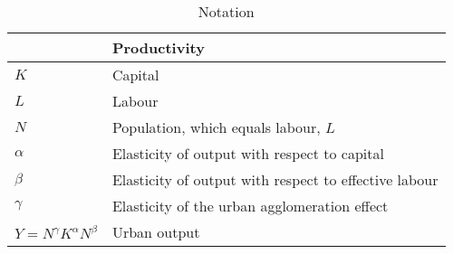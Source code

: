 \newpage
\begin{longtable}{lp{10cm}}
\caption{Notation}                       \\

\hline           &  \textbf{Productivity} \\ \hline
$K$              &  Capital               \\ 
$L$              &  Labour                \\
$N$              &  Population, which equals labour, $L$                  \\ 
$\alpha$         &  Elasticity of output with respect to capital          \\
$\beta$          &  Elasticity of output with respect to effective labour \\
$\gamma$         &  Elasticity of the urban agglomeration effect          \\ %
$Y=N^\gamma K^{\alpha }N^{\beta }$  &  Urban output                       \\




\end{longtable}
